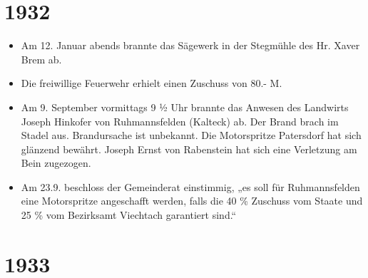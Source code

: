 \documentclass[12pt,a4paper]{book}
\begin{document}
\section*{1932}

\begin{itemize}
\item Am 12. Januar abends brannte das Sägewerk in der Stegmühle des Hr. Xaver
Brem ab.

\item Die freiwillige Feuerwehr erhielt einen Zuschuss von 80.- M.

\item Am 9. September vormittags 9 ½ Uhr brannte das Anwesen des Landwirts
Joseph Hinkofer von Ruhmannsfelden (Kalteck) ab. Der Brand brach im Stadel aus.
Brandursache ist unbekannt. Die Motorspritze Patersdorf hat sich glänzend
bewährt. Joseph Ernst von Rabenstein hat sich eine Verletzung am Bein zugezogen.

\item Am 23.9. beschloss der Gemeinderat einstimmig, „es soll für Ruhmannsfelden
eine Motorspritze angeschafft werden, falls die 40 \% Zuschuss vom Staate und 25
\% vom Bezirksamt Viechtach garantiert sind.“
\end{itemize}

\section*{1933}
\end{document}
